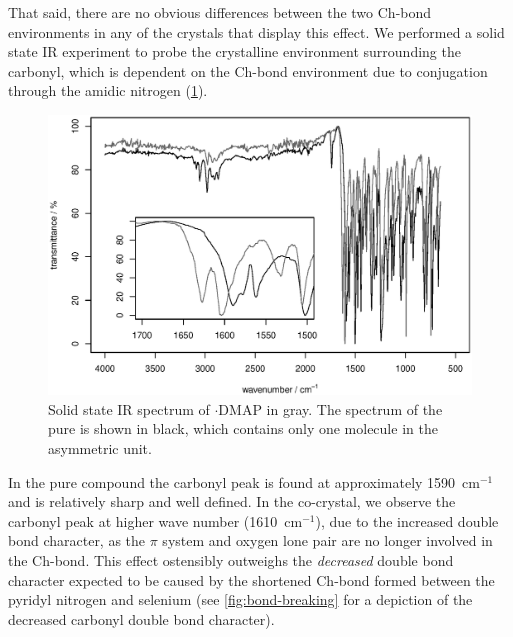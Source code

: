 \begin{refsection}
That said, there are no obvious differences between the two Ch-bond environments in any of the crystals that display this effect.
We performed a solid state IR experiment to probe the crystalline environment surrounding the carbonyl, which is dependent on the Ch-bond environment due to conjugation through the amidic nitrogen (\cref{fig:ebs-4oet-dmap-ir}).

\begin{figure}
    \centering
    \includegraphics[width=0.9\linewidth]{Figures/ebs-4oet-dmap-ir.eps}
    \caption[Solid state IR spectrum of $ \cdot $DMAP.]{Solid state IR spectrum of $ \cdot $DMAP in gray. The spectrum of the pure  is shown in black, which contains only one molecule in the asymmetric unit.}\label{fig:ebs-4oet-dmap-ir}
\end{figure}

In the pure compound the carbonyl peak is found at approximately 1590~cm$^{-1}$ and is relatively sharp and well defined.
In the co-crystal, we observe the carbonyl peak at higher wave number (1610~cm$^{-1}$), due to the increased double bond character, as the $\pi$ system and oxygen lone pair are no longer involved in the Ch-bond.
This effect ostensibly outweighs the \emph{decreased} double bond character expected to be caused by the shortened Ch-bond formed between the pyridyl nitrogen and selenium (see \cref{fig:bond-breaking} for a depiction of the decreased carbonyl double bond character).


\end{refsection}
